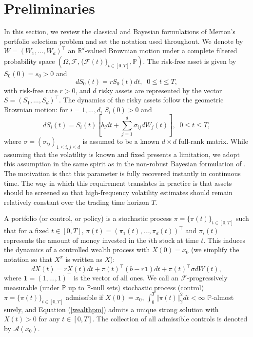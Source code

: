 \documentclass[11pt]{article}
\theoremstyle{definition}
\begin{document}
\section{Preliminaries}\label{Merton}
In this section, we review the classical and Bayesian formulations of Merton's portfolio selection problem and set the notation used throughout. We denote by $W = \left(W_1, \ldots, W_d\right)^\top$ an $\mathbb{R}^d$-valued Brownian motion under a complete filtered probability space $(\Omega, \mathcal{F}, \{\mathcal{F}(t)\}_{t \in [0,T]}, \mathbb{P})$. The risk-free asset is given by $S_{0}(0) = s_0 > 0$ and 
$$
d S_{0}(t) = r S_{0}(t) d t, \;\; 0 \leq t \leq T,
$$
with risk-free rate $r> 0$, and $d$ risky assets are represented by the vector $S = \left(S_1, \ldots, S_d\right)^\top$. The dynamics of the risky assets follow the geometric Brownian motion: for $i = 1, \ldots,d$, $S_{i}(0) > 0$ and 
$$
 d S_{i}(t) = S_{i}(t)\left[b_idt + \sum_{j=1}^d\sigma_{ij}dW_{j}(t)\right],\;\; 0 \leq t \leq T {,}  
$$ {where $\sigma = \left(\sigma_{ij}\right)_{1\leq i,j\leq d}$ is assumed to be a known $d \times d$ full-rank matrix. While assuming that the volatility is known and fixed presents a limitation, %
we adopt this assumption in the same spirit as in the non-robust Bayesian formulation of \cite{KZ98}. The motivation is that this parameter is fully recovered instantly in continuous time. The way in which this requirement translates in practice is that assets should be screened so that high-frequency volatility estimates should remain relatively constant over the trading time horizon $T$.}


A portfolio (or control, or policy) is a stochastic process $\pi = \{\pi(t)\}_{t \in [0,T]}$ such that for a fixed $t \in [0,T]$, $\pi(t) = \left(\pi_{1}(t), \ldots, \pi_{d}(t)\right)^\top$ and $\pi_{i}(t)$ represents the amount of money invested in the $i$th stock at time $t$. This induces the dynamics of a controlled wealth process with $X(0) = x_0$ (we simplify the notation so that $X^{\pi}$ is written as $X$): 
\begin{equation}\label{wealthpm}
		d X(t) =  rX(t)dt + \pi(t)^\top\left(b-r\mathbf{1}\right)dt + \pi(t)^\top \sigma dW(t),
\end{equation}where $\mathbf{1} = \left(1, \ldots, 1\right)^\top$ is the vector of all ones.
We call an $\mathcal{F}$-progressively measurable (under $\mathbb{P}$ up to $\mathbb{P}$-null sets) stochastic process (control) $\pi= \{\pi(t)\}_{t \in [0,T]}$ admissible if $X(0) = x_0$, $\int_0^T \left \Vert \pi(t) \right\Vert_2^2dt < \infty$ $\mathbb{P}$-almost surely, and 
     Equation (\ref{wealthpm}) admits a unique strong solution with $X(t) > 0$ for any $t \in [0,T]$. The collection of all admissible controls is denoted by $\mathcal{A}(x_0)$.
\end{document}
